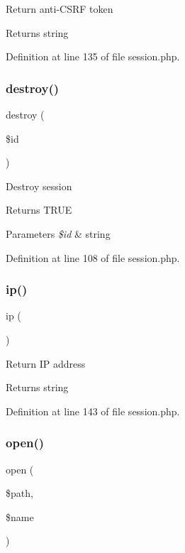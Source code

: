 Return anti-\/\+C\+S\+RF token \begin{DoxyReturn}{Returns}
string 
\end{DoxyReturn}


Definition at line 135 of file session.\+php.

\hypertarget{class_session_a726fa8a4b4b187b9ca32ba427aac8137}{}\label{class_session_a726fa8a4b4b187b9ca32ba427aac8137} 
\subsubsection{\texorpdfstring{destroy()}{destroy()}}
{\footnotesize\ttfamily destroy (\begin{DoxyParamCaption}\item[{}]{\$id }\end{DoxyParamCaption})}

Destroy session \begin{DoxyReturn}{Returns}
T\+R\+UE 
\end{DoxyReturn}

\begin{DoxyParams}{Parameters}
{\em \$id} & string \\
\hline
\end{DoxyParams}


Definition at line 108 of file session.\+php.

\hypertarget{class_session_a197bae3714812901860bd006b00f91de}{}\label{class_session_a197bae3714812901860bd006b00f91de} 
\subsubsection{\texorpdfstring{ip()}{ip()}}
{\footnotesize\ttfamily ip (\begin{DoxyParamCaption}{ }\end{DoxyParamCaption})}

Return IP address \begin{DoxyReturn}{Returns}
string 
\end{DoxyReturn}


Definition at line 143 of file session.\+php.

\hypertarget{class_session_a037c59224bcb347b69ca61df88ef7230}{}\label{class_session_a037c59224bcb347b69ca61df88ef7230} 
\subsubsection{\texorpdfstring{open()}{open()}}
{\footnotesize\ttfamily open (\begin{DoxyParamCaption}\item[{}]{\$path,  }\item[{}]{\$name }\end{DoxyParamCaption})}


